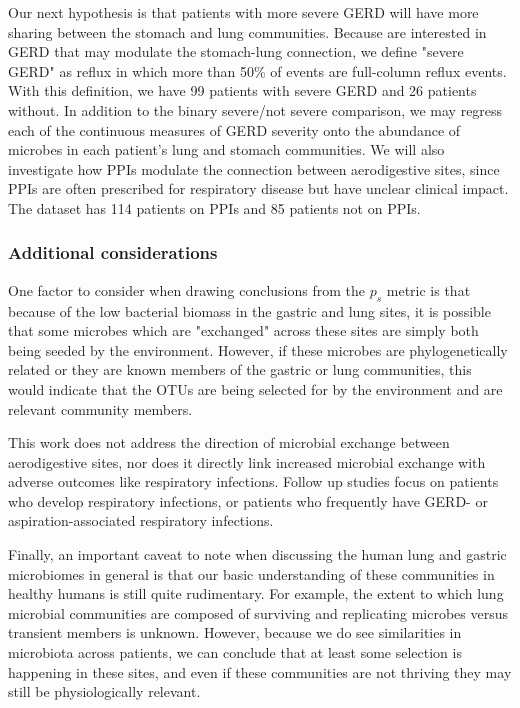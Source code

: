 \documentclass[12pt]{article}
\begin{document}
Our next hypothesis is that patients with more severe GERD will have more sharing between the stomach and lung communities. Because are interested in GERD that may modulate the stomach-lung connection, we define "severe GERD" as reflux in which more than 50\% of events are full-column reflux events. With this definition, we have 99 patients with severe GERD and 26 patients without. In addition to the binary severe/not severe comparison, we may regress each of the continuous measures of GERD severity onto the abundance of microbes in each patient's lung and stomach communities. We will also investigate how PPIs modulate the connection between aerodigestive sites, since PPIs are often prescribed for respiratory disease but have unclear clinical impact. The dataset has 114 patients on PPIs and 85 patients not on PPIs.

\subsubsection{Additional considerations}
One factor to consider when drawing conclusions from the $p_s$ metric is that because of the low bacterial biomass in the gastric and lung sites, it is possible that some microbes which are "exchanged" across these sites are simply both being seeded by the environment. However, if these microbes are phylogenetically related or they are known members of the gastric or lung communities, this would indicate that the OTUs are being selected for by the environment and are relevant community members.

This work does not address the direction of microbial exchange between aerodigestive sites, nor does it directly link increased microbial exchange with adverse outcomes like respiratory infections. Follow up studies focus on patients who develop respiratory infections, or patients who frequently have GERD- or aspiration-associated respiratory infections. 

Finally, an important caveat to note when discussing the human lung and gastric microbiomes in general is that our basic understanding of these communities in healthy humans is still quite rudimentary. For example, the extent to which lung microbial communities are composed of surviving and replicating microbes versus transient members is unknown. However, because we do see similarities in microbiota across patients, we can conclude that at least some selection is happening in these sites, and even if these communities are not thriving they may still be physiologically relevant.
\end{document}

